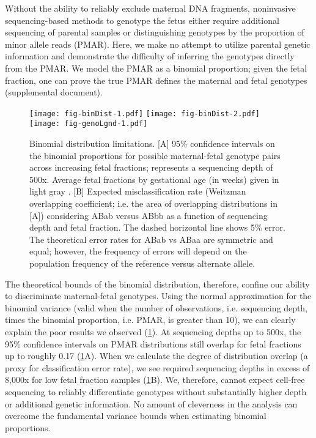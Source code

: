 \documentclass{article}\usepackage[]{graphicx}\usepackage[]{color}
\begin{document}
Without the ability to reliably exclude maternal DNA fragments, noninvasive sequencing-based methods to genotype the fetus either require additional sequencing of parental samples or distinguishing genotypes by the proportion of minor allele reads (PMAR).
Here, we make no attempt to utilize parental genetic information and demonstrate the difficulty of inferring the genotypes directly from the PMAR.
We model the PMAR as a binomial proportion; given the fetal fraction, one can prove the true PMAR defines the maternal and fetal genotypes (supplemental document).

\begin{figure}
  \centering
  \texttt{[image: fig-binDist-1.pdf]}%
  \texttt{[image: fig-binDist-2.pdf]}
  \texttt{[image: fig-genoLgnd-1.pdf]}
  \caption{Binomial distribution limitations. [A] 95\% confidence intervals on the binomial proportions for possible maternal-fetal genotype pairs across increasing fetal fractions; represents a sequencing depth of 500x. Average fetal fractions by gestational age (in weeks) given in light gray \cite{kinnings:2015aa}. [B] Expected misclassification rate (Weitzman overlapping coefficient; i.e. the area of overlapping distributions in [A]) considering ABab versus ABbb as a function of sequencing depth and fetal fraction. The dashed horizontal line shows 5\% error. The theoretical error rates for ABab vs ABaa are symmetric and equal; however, the frequency of errors will depend on the population frequency of the reference versus alternate allele.}
  \label{fig:binDist}
\end{figure}

The theoretical bounds of the binomial distribution, therefore, confine our ability to discriminate maternal-fetal genotypes.
Using the normal approximation for the binomial variance (valid when the number of observations, i.e. sequencing depth, times the binomial proportion, i.e. PMAR, is greater than 10), we can clearly explain the poor results we observed (\cref{fig:binDist}).
At sequencing depths up to 500x, the 95\% confidence intervals on PMAR distributions still overlap for fetal fractions up to roughly 0.17 (\cref{fig:binDist}A).
When we calculate the degree of distribution overlap (a proxy for classification error rate), we see required sequencing depths in excess of 8,000x for low fetal fraction samples (\cref{fig:binDist}B).
We, therefore, cannot expect cell-free sequencing to reliably differentiate genotypes without substantially higher depth or additional genetic information.
No amount of cleverness in the analysis can overcome the fundamental variance bounds when estimating binomial proportions.
\end{document}
